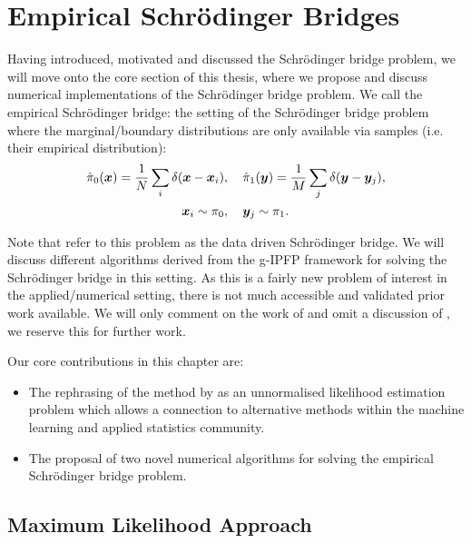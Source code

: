 \documentclass[a4paper,12pt,twoside,openright]{report}
\theoremstyle{definition}
\begin{document}
\chapter{Empirical Schrödinger Bridges}

Having introduced, motivated and discussed the Schrödinger bridge problem, we will move onto the core section of this thesis, where we propose and discuss numerical implementations of the Schrödinger bridge problem. We call the empirical Schrödinger bridge: the setting of the Schrödinger bridge problem where the marginal/boundary distributions are only available via samples (i.e. their empirical distribution):
\begin{align}
    \hat{\pi}_0({\bm{x}})  = \frac{1}{N}\sum_i \delta({\bm{x}} -{\bm{x}}_i) &, \quad\hat{\pi}_1({\bm{y}})  = \frac{1}{M}\sum_j \delta({\bm{y}} -{\bm{y}}_j), \nonumber\\
    {\bm{x}}_i \sim \pi_0 &, \quad {\bm{y}}_j \sim \pi_1.
\end{align}

Note that \cite{pavon2018data} refer to this problem as the data driven Schrödinger bridge. We will discuss different algorithms derived from the g-IPFP framework for solving the Schrödinger bridge in this setting. As this is a fairly new problem of interest in the applied/numerical setting, there is not much accessible and validated prior work available. We will only comment on the work of \cite{pavon2018data} and omit a discussion of \cite{bernton2019schr}, we reserve this for further work.

Our core contributions in this chapter are:

\begin{itemize}
    \item The rephrasing of the method by \cite{pavon2018data} as an unnormalised likelihood estimation problem which allows a connection to alternative methods within the machine learning and applied statistics community.
    \item The proposal of two novel numerical algorithms for solving the empirical Schrödinger bridge problem.
\end{itemize}



\section{Maximum Likelihood Approach \citep{pavon2018data}}
\end{document}
